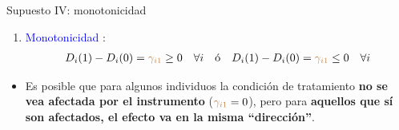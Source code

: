 \documentclass[10pt, xcolor=dvipsnames]{beamer}
\begin{document}
\begin{frame}{Supuesto IV: monotonicidad}
	\begin{enumerate}
		\item[IV.] \textcolor{blue}{Monotonicidad} \citep{Imbens94}: 
		\begin{align*}
		D_i(1) - D_i(0) =\textcolor{brown}{\gamma_{i1}}\geq0 \quad \forall i \quad \text{ó} \quad D_i(1) - D_i(0) = \textcolor{brown}{\gamma_{i1}}\leq0 \quad \forall i
		\end{align*} 
	\end{enumerate}
	\begin{itemize}
		\item 	Es posible que para algunos individuos la condición de tratamiento \textbf{no se vea afectada por el instrumento} ($\textcolor{brown}{\gamma_{i1}}=0$), pero para \textbf{aquellos que sí son afectados, el efecto va en la misma ``dirección''}.	
	\end{itemize} 
\end{frame}
\end{document}
